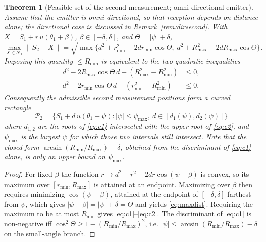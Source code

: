 \documentclass[journal,10pt]{IEEEtran}
\newtheorem{theorem}{Theorem}
\theoremstyle{definition}
\newcommand{\Rmin}{R_{\min}}
\newcommand{\Rmax}{R_{\max}}
\newcommand{\bP}{\mathcal{P}}
\newcommand{\bF}{\mathcal{F}}
\begin{document}
\begin{theorem}[Feasible set of the second measurement; omni-directional emitter]
\label{thm:second}
Assume that the emitter is omni-directional, so that reception depends on distance alone; the
directional case is discussed in Remark~\ref{rem:dirsecond}.
With $X=S_1+r\,u(\theta_1+\beta)$, $\beta\in[-\delta,\delta]$, and $\Theta=|\psi|+\delta$,
\begin{equation}
\max_{X\in\bF_1}\|S_2-X\|=\sqrt{\max\{d^2+r_{\min}^2-2dr_{\min}\cos\Theta,\;
d^2+\Rmax^2-2d\Rmax\cos\Theta\}}.
\label{eq:maxdist}
\end{equation}
Imposing this quantity $\le \Rmin$ is equivalent to the two quadratic inequalities
\begin{align}
d^2-2\Rmax\cos\Theta\,d+(\Rmax^2-\Rmin^2)&\le0,\label{eq:c1}\\
d^2-2r_{\min}\cos\Theta\,d+(r_{\min}^2-\Rmin^2)&\le0.\label{eq:c2}
\end{align}
Consequently the admissible second measurement positions form a curved rectangle
\begin{equation}
\bP_2=\{S_1+d\,u(\theta_1+\psi):|\psi|\le\psi_{\max},\ d\in[d_1(\psi),d_2(\psi)]\}
\end{equation}
where $d_{1,2}$ are the roots of \eqref{eq:c1} intersected with the upper root of \eqref{eq:c2},
and $\psi_{\max}$ is the largest $\psi$ for which those two intervals still intersect. Note that
the closed form $\arcsin(\Rmin/\Rmax)-\delta$, obtained from the discriminant of \eqref{eq:c1}
alone, is only an \emph{upper bound} on $\psi_{\max}$.
\end{theorem}
\begin{proof}
For fixed $\beta$ the function $r\mapsto d^2+r^2-2dr\cos(\psi-\beta)$ is convex, so its maximum
over $[r_{\min},\Rmax]$ is attained at an endpoint. Maximizing over $\beta$ then requires
minimizing $\cos(\psi-\beta)$, attained at the endpoint of $[-\delta,\delta]$ farthest from
$\psi$, which gives $|\psi-\beta|=|\psi|+\delta=\Theta$ and yields \eqref{eq:maxdist}. Requiring
the maximum to be at most $\Rmin$ gives \eqref{eq:c1}--\eqref{eq:c2}. The discriminant of
\eqref{eq:c1} is non-negative iff $\cos^2\Theta\ge1-(\Rmin/\Rmax)^2$, i.e.
$|\psi|\le\arcsin(\Rmin/\Rmax)-\delta$ on the small-angle branch.
\end{proof}
\end{document}
